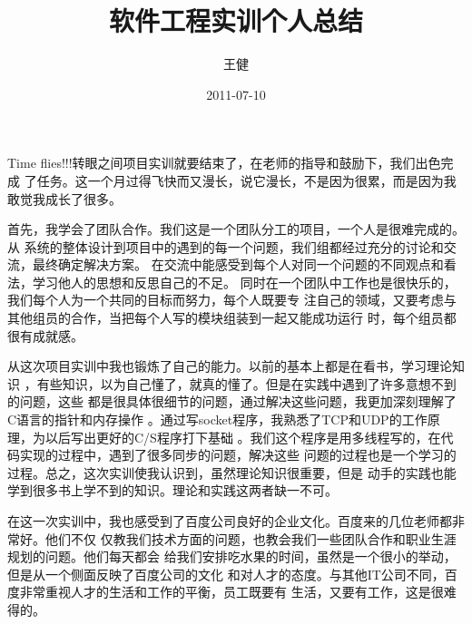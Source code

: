 \documentclass[12pt, a4paper, titlepage]{article}
\title{软件工程实训个人总结}
\author{王健 \quad 200800300234}
\date{2011-07-10}
\begin{document}
\maketitle
\par{Time flies!!!转眼之间项目实训就要结束了，在老师的指导和鼓励下，我们出色完成
了任务。这一个月过得飞快而又漫长，说它漫长，不是因为很累，而是因为我敢觉我成长了很多。}
\par{首先，我学会了团队合作。我们这是一个团队分工的项目，一个人是很难完成的。从
系统的整体设计到项目中的遇到的每一个问题，我们组都经过充分的讨论和交流，最终确定解决方案。
在交流中能感受到每个人对同一个问题的不同观点和看法，学习他人的思想和反思自己的不足。
同时在一个团队中工作也是很快乐的，我们每个人为一个共同的目标而努力，每个人既要专
注自己的领域，又要考虑与其他组员的合作，当把每个人写的模块组装到一起又能成功运行
时，每个组员都很有成就感。}
\par{从这次项目实训中我也锻炼了自己的能力。以前的基本上都是在看书，学习理论知识
，有些知识，以为自己懂了，就真的懂了。但是在实践中遇到了许多意想不到的问题，这些
都是很具体很细节的问题，通过解决这些问题，我更加深刻理解了C语言的指针和内存操作
。通过写socket程序，我熟悉了TCP和UDP的工作原理，为以后写出更好的C/S程序打下基础
。我们这个程序是用多线程写的，在代码实现的过程中，遇到了很多同步的问题，解决这些
问题的过程也是一个学习的过程。总之，这次实训使我认识到，虽然理论知识很重要，但是
动手的实践也能学到很多书上学不到的知识。理论和实践这两者缺一不可。}
\par{在这一次实训中，我也感受到了百度公司良好的企业文化。百度来的几位老师都非常好。他们不仅
仅教我们技术方面的问题，也教会我们一些团队合作和职业生涯规划的问题。他们每天都会
给我们安排吃水果的时间，虽然是一个很小的举动，但是从一个侧面反映了百度公司的文化
和对人才的态度。与其他IT公司不同，百度非常重视人才的生活和工作的平衡，员工既要有
生活，又要有工作，这是很难得的。}
\par{}
\end{document}
